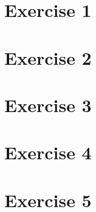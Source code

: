 \documentclass[a4paper,11pt]{article}
\begin{document}


%

\section{Exercise 1}


\section{Exercise 2}


\section{Exercise 3}


\section{Exercise 4}


\section{Exercise 5}

\end{document}
